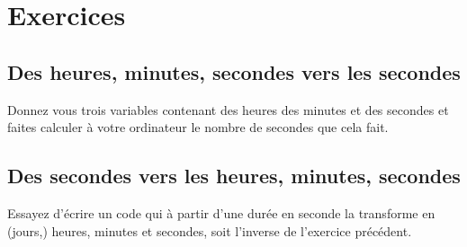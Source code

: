 \section*{Exercices}
{}
\subsection*{Des heures, minutes, secondes vers les secondes}
Donnez vous trois variables contenant des heures des minutes et des secondes
et faites calculer à votre ordinateur le nombre de secondes que cela fait.


\subsection*{Des secondes vers les heures, minutes, secondes}
Essayez d'écrire un code qui à partir d'une durée en seconde la transforme en (jours,) heures, minutes et secondes, soit l'inverse de l'exercice précédent.

